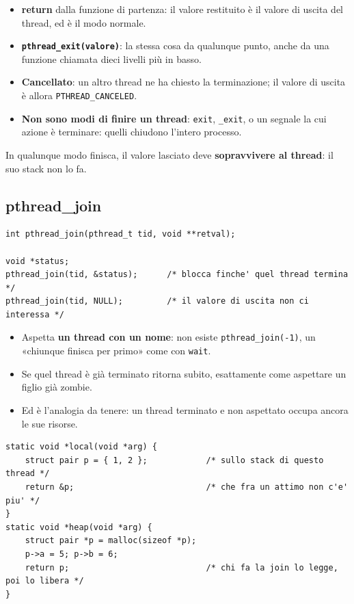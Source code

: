 \begin{itemize}
    \item \textbf{return} dalla funzione di partenza: il valore restituito è il valore di uscita del thread, ed è il modo
          normale.
    \item \textbf{\texttt{pthread\_exit(valore)}}: la stessa cosa da qualunque punto, anche da una funzione chiamata dieci
          livelli più in basso.
    \item \textbf{Cancellato}: un altro thread ne ha chiesto la terminazione; il valore di uscita è allora
          \texttt{PTHREAD\_CANCELED}.
    \item \textbf{Non sono modi di finire un thread}: \texttt{exit}, \texttt{\_exit}, o un segnale la cui azione è
          terminare: quelli chiudono l'intero processo.
\end{itemize}
In qualunque modo finisca, il valore lasciato deve \textbf{sopravvivere al thread}: il suo stack non lo fa.

\subsection{pthread\_join}

\begin{lstlisting}[language={[POSIX]C}]
int pthread_join(pthread_t tid, void **retval);

void *status;
pthread_join(tid, &status);      /* blocca finche' quel thread termina */
pthread_join(tid, NULL);         /* il valore di uscita non ci interessa */
\end{lstlisting}

\begin{itemize}
    \item Aspetta \textbf{un thread con un nome}: non esiste \texttt{pthread\_join(-1)}, un «chiunque finisca per primo»
          come con \texttt{wait}.
    \item Se quel thread è già terminato ritorna subito, esattamente come aspettare un figlio già zombie.
    \item Ed è l'analogia da tenere: un thread terminato e non aspettato occupa ancora le sue risorse.
\end{itemize}

\begin{lstlisting}[language={[POSIX]C}, style=wnumbers, title={Il valore deve sopravvivere al thread}]
static void *local(void *arg) {
    struct pair p = { 1, 2 };            /* sullo stack di questo thread */
    return &p;                           /* che fra un attimo non c'e' piu' */
}
static void *heap(void *arg) {
    struct pair *p = malloc(sizeof *p);
    p->a = 5; p->b = 6;
    return p;                            /* chi fa la join lo legge, poi lo libera */
}
\end{lstlisting}

